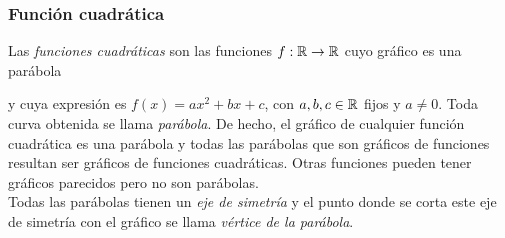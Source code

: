 \documentclass[../Teoría.root.tex]{subfiles}
\begin{document}
        \subsubsection{Función cuadrática}
        Las \textit{funciones cuadráticas} son las funciones \(f: \mathbb{R} \rightarrow \mathbb{R}\) cuyo gráfico es una parábola
        \begin{center}
        \end{center}
        y cuya expresión es \(f(x)=ax^2+bx+c\), con \(a,b,c\in\mathbb{R}\) fijos y \(a\neq0\).
        Toda curva obtenida se llama \textit{parábola}. De hecho, el gráfico de cualquier función cuadrática es una parábola y todas las parábolas que son gráficos de funciones resultan ser gráficos de funciones cuadráticas. Otras funciones pueden tener gráficos parecidos pero no son parábolas.\\
        Todas las parábolas tienen un \textit{eje de simetría} y el punto donde se corta este eje de simetría con el gráfico se llama \textit{vértice de la parábola}.
\end{document}
